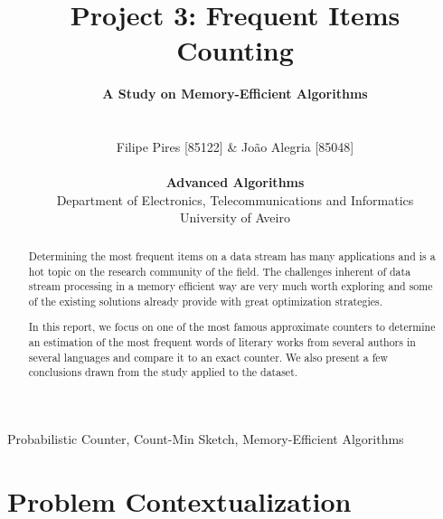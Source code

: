 \documentclass[shortpaper]{revdetua}
\begin{document}
 

\title{
    \LARGE{{\bf Project 3: Frequent Items Counting \/}}
    \vspace{-20pt}
}

\author{
    \Large{{\bf A Study on Memory-Efficient Algorithms\/}}\\\\\\
    Filipe Pires [85122] \& João Alegria [85048]\\
    \\
    {\bf Advanced Algorithms\/}\\
    \normalsize{Department of Electronics, Telecommunications and Informatics}\\
    \normalsize{University of Aveiro}\\
} 

\maketitle %

\begin{abstract}
    Determining the most frequent items on a data stream has many applications and is a hot topic on the research community of the field.
    The challenges inherent of data stream processing in a memory efficient way are very much worth exploring and some of the existing solutions already provide
    with great optimization strategies.

    In this report, we focus on one of the most famous approximate counters to determine an estimation of the most frequent words of literary works from several 
    authors in several languages and compare it to an exact counter.
    We also present a few conclusions drawn from the study applied to the dataset.
\end{abstract}

\begin{keywords}
    Probabilistic Counter, Count-Min Sketch, Memory-Efficient Algorithms
\end{keywords}

\section{Problem Contextualization}\label{problem} %
\end{document}
